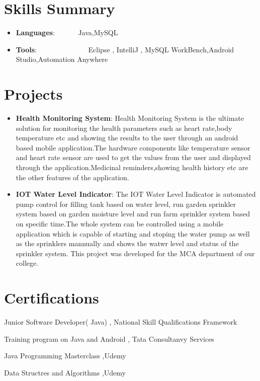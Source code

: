 \documentclass[a4paper,20pt]{article}
\newcommand{\resumeItem}[2]{
	\item\small{
		\textbf{#1}{: #2 \vspace{-2pt}}
	}
}
\newcommand{\resumeSubItem}[2]{\resumeItem{#1}{#2}\vspace{-3pt}}
\newcommand{\resumeSubHeadingListStart}{\begin{itemize}[leftmargin=*]}
\newcommand{\resumeSubHeadingListEnd}{\end{itemize}}
\begin{document}
\vspace{-5pt}
\section{Skills Summary}
	\resumeSubHeadingListStart
		\resumeSubItem{Languages}{~~~~~~Java,MySQL}
		\resumeSubItem{Tools}{~~~~~~~~~~~~~~Eclipse , IntelliJ , MySQL WorkBench,Android Studio,Automation Anywhere}
		
	\resumeSubHeadingListEnd

\vspace{-5pt}
\section{Projects}
	\resumeSubHeadingListStart
		\resumeSubItem{Health Monitoring System}{Health Monitoring System is the ultimate solution for monitoring the health parameters such as heart rate,body temperature etc and showing the results to the user through an android based mobile application.The hardware components like temperature sensor and heart rate sensor  are used to get the values from the user and displayed through the application.Medicinal reminders,showing health history etc are the other features of the application.}
		
		\vspace{2pt}
		\resumeSubItem{IOT Water Level Indicator}{The IOT Water Level Indicator is automated pump control for filling tank based on water level, run garden sprinkler system based on garden moisture level and run farm sprinkler system based on specific time.The whole system can be controlled using a mobile application which is capable of starting and stoping the water pump as well as the sprinklers mannually and shows the watwr level and status of the sprinkler system.  This project was developed for the MCA department of our college.}
\resumeSubHeadingListEnd
		
\vspace{-5pt}
\section{Certifications}
	\begin{description}[font=$\bullet$]
		\item {Junior Software Developer( Java) , National Skill Qualifications Framework }
		\vspace{-5pt}
		\item {Training program on Java and Android , Tata Consultanvy Services}
		\vspace{-5pt}
		\item {Java Programming Masterclass ,Udemy}
		\vspace{-5pt}
		\item {Data Structres and Algorithms ,Udemy}
	\end{description}
\end{document}
